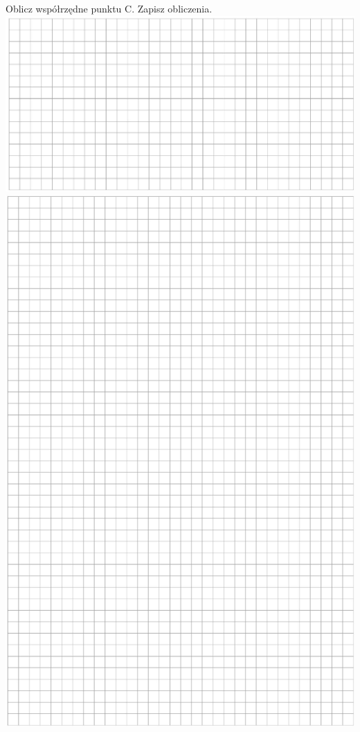 \documentclass[10pt]{article}
\begin{document}
Oblicz współrzędne punktu C. Zapisz obliczenia.\\
\includegraphics[max width=\textwidth, center]{2024_11_21_f1ecc00f5c4ab21f0d04g-22}\\
\includegraphics[max width=\textwidth, center]{2024_11_21_f1ecc00f5c4ab21f0d04g-23}\\
\end{document}
